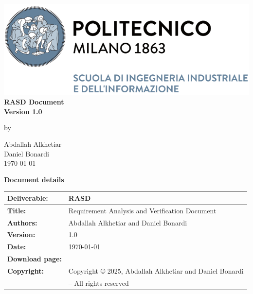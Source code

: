 \documentclass[11pt,twoside]{article}
\begin{document}
\begin{center}
\thispagestyle{empty}
\includegraphics[scale=1.25]{Images/PolimiLogo}\\
\vspace{4cm}
\textbf{\Huge{RASD Document}}\\
\vspace{1.5cm}
\textbf{\Large{Version 1.0}}\\
\bigskip \par
by \par
\large{Abdallah Alkhetiar}\\
\large{Daniel Bonardi}\\
\bigskip \bigskip
\large{\today}
\end{center}

\newpage

\setcounter{page}{1}
\begin{center}
\textbf{\Huge{Document details}}
\end{center}
\begin{table}[h!]
\begin{tabu} to \textwidth { |X[0.25,r,p] || X[0.75,l,p]| }
\hline

\textbf{Deliverable:} & RASD\\
\hline
\textbf{Title:} & Requirement Analysis and Verification Document \\
\hline
\textbf{Authors:} & Abdallah Alkhetiar and Daniel Bonardi \\
\hline
\textbf{Version:} & 1.0 \\ 
\hline
\textbf{Date:} & \today \\
\hline
\textbf{Download page:} & \href{https://github.com/Zero3474/AlkhetiarBonardi.git}{\texttt{\color{blue}{https://github.com/Zero3474/AlkhetiarBonardi.git}}} \\
\hline
\textbf{Copyright:} & Copyright © 2025, Abdallah Alkhetiar and Daniel Bonardi \\
& – All rights reserved \\
\hline
\end{tabu}
\end{table}
\end{document}
